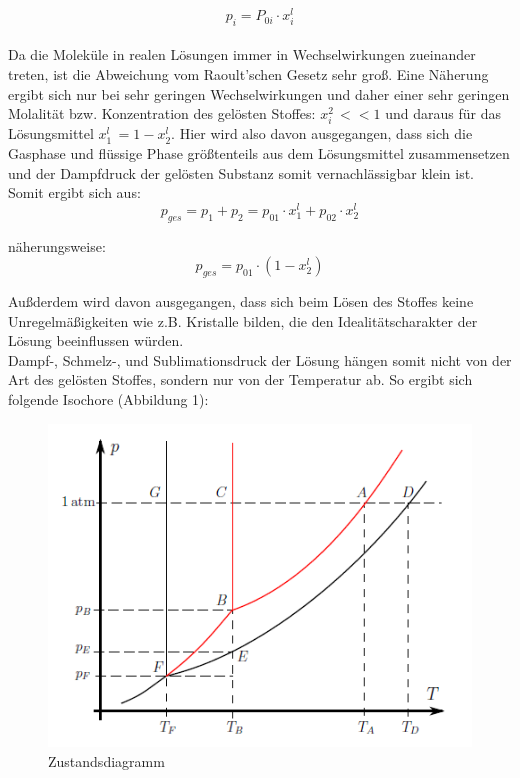 \documentclass[12pt,a4paper,titlepage,headinclude,bibtotoc]{scrartcl}
\begin{document}
\begin{equation}
p_i = P_{0i} \cdot x_i^{l}
\end{equation}
\\

Da die Moleküle in realen Lösungen immer in Wechselwirkungen zueinander treten, ist die Abweichung vom Raoult'schen Gesetz sehr groß. Eine Näherung ergibt sich nur bei sehr geringen Wechselwirkungen und daher einer sehr geringen Molalität bzw. Konzentration des gelösten Stoffes: $x_i^2\,<<1$ und daraus für das Lösungsmittel $x_1^l\,= 1 - x_2^l$. Hier wird also davon ausgegangen, dass sich die Gasphase und flüssige Phase größtenteils aus dem Lösungsmittel zusammensetzen und der Dampfdruck der gelösten Substanz somit vernachlässigbar klein ist. Somit ergibt sich aus: \\

\begin{equation}
p_{ges} = p_1 + p_2 = p_{01} \cdot x_1^l + p_{02} \cdot x_2^l
\end{equation}

näherungsweise:
\begin{equation}
p_{ges} = p_{01} \cdot (1-x_2^l)
\end{equation}

Außderdem wird davon ausgegangen, dass sich beim Lösen des Stoffes keine Unregelmäßigkeiten wie z.B. Kristalle bilden, die den Idealitätscharakter der Lösung beeinflussen würden.\\

Dampf-, Schmelz-, und Sublimationsdruck der Lösung hängen somit nicht von der Art des gelösten Stoffes, sondern nur von der Temperatur ab. So ergibt sich folgende Isochore (Abbildung 1):\\

\newpage

\begin{figure} [h!]
\begin{center}
\includegraphics[scale=1]{Phasendiagramm.png} \end{center}
\caption {Zustandsdiagramm \protect\footnotemark}
\end{figure}
\end{document}
